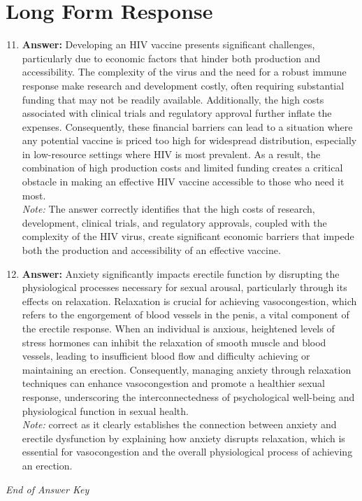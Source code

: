 \documentclass[12pt]{article}
\begin{document}
\section*{Long Form Response}
\begin{enumerate}[label=\arabic*.]
\setcounter{enumi}{10}
\item \textbf{Answer:} Developing an HIV vaccine presents significant challenges, particularly due to economic factors that hinder both production and accessibility. The complexity of the virus and the need for a robust immune response make research and development costly, often requiring substantial funding that may not be readily available. Additionally, the high costs associated with clinical trials and regulatory approval further inflate the expenses. Consequently, these financial barriers can lead to a situation where any potential vaccine is priced too high for widespread distribution, especially in low-resource settings where HIV is most prevalent. As a result, the combination of high production costs and limited funding creates a critical obstacle in making an effective HIV vaccine accessible to those who need it most.
\\ \textit{Note:} The answer correctly identifies that the high costs of research, development, clinical trials, and regulatory approvals, coupled with the complexity of the HIV virus, create significant economic barriers that impede both the production and accessibility of an effective vaccine.
\item \textbf{Answer:} Anxiety significantly impacts erectile function by disrupting the physiological processes necessary for sexual arousal, particularly through its effects on relaxation. Relaxation is crucial for achieving vasocongestion, which refers to the engorgement of blood vessels in the penis, a vital component of the erectile response. When an individual is anxious, heightened levels of stress hormones can inhibit the relaxation of smooth muscle and blood vessels, leading to insufficient blood flow and difficulty achieving or maintaining an erection. Consequently, managing anxiety through relaxation techniques can enhance vasocongestion and promote a healthier sexual response, underscoring the interconnectedness of psychological well-being and physiological function in sexual health.
\\ \textit{Note:} correct as it clearly establishes the connection between anxiety and erectile dysfunction by explaining how anxiety disrupts relaxation, which is essential for vasocongestion and the overall physiological process of achieving an erection.
\end{enumerate}

\vfill
\noindent\textit{End of Answer Key}
\end{document}
